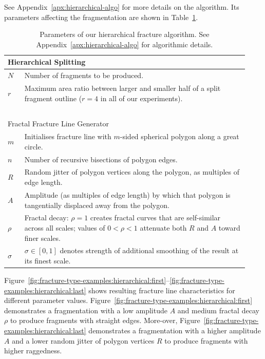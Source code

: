 \documentclass[acmlarge,screen,dvipsnames]{acmart}
\begin{document}
See Appendix~\ref{apx:hierarchical-algo} for more details on the
algorithm. Its parameters affecting the fragmentation are shown in
Table~\ref{tab:hierarchical-parameters}.
%
\begin{table}[tb]
  \begin{tabular}{|l|p{0.933\linewidth}|}
    \hline
    \multicolumn{2}{|l|}{Hierarchical Splitting}\\
    \hline
    $N$ & Number of fragments to be produced.\\
    $r$ & Maximum area ratio between larger and smaller half of a split fragment outline ($r=4$ in all of our experiments).\\
    \hline
    \multicolumn{2}{l}{~}\\[-1.33ex]
    \hline
    \multicolumn{2}{|l|}{Fractal Fracture Line Generator}\\
    \hline
    $m$ & Initialises fracture line with $m$-sided spherical polygon along a great circle.\\
    $n$ & Number of recursive bisections of polygon edges.\\
    $R$ & Random jitter of polygon vertices along the polygon, as multiples of edge length.\\
    $A$ & Amplitude (as multiples of edge length) by which that polygon is tangentially displaced away from the polygon.\\
    $\rho$ & Fractal decay: $\rho=1$ creates fractal curves that are
    self-similar across all scales; values of $0 < \rho < 1$ attenuate both
    $R$ and $A$ toward finer scales.\\
    $\sigma$ & $\sigma\in[0,1]$ denotes strength of additional smoothing of the result at its finest scale.\\
    \hline
  \end{tabular}
  \caption{\label{tab:hierarchical-parameters}%
    Parameters of our hierarchical fracture algorithm.
    See Appendix~\ref{apx:hierarchical-algo} for algorithmic details.\vspace{-1.0\baselineskip}}
\end{table}
%
Figure~\ref{fig:fracture-type-examples:hierarchical:first}--\ref{fig:fracture-type-examples:hierarchical:last}
shows resulting fracture line characteristics for different parameter
values. Figure~\ref{fig:fracture-type-examples:hierarchical:first}
demonstrates a fragmentation with a low amplitude $A$ and medium
fractal decay $\rho$ to produce fragments with straight
edges. More-\goodbreak over,
Figure~\ref{fig:fracture-type-examples:hierarchical:last} demonstrates
a fragmentation with a higher amplitude $A$ and a lower random jitter
of polygon vertices $R$ to produce fragments with higher raggedness.
\end{document}
